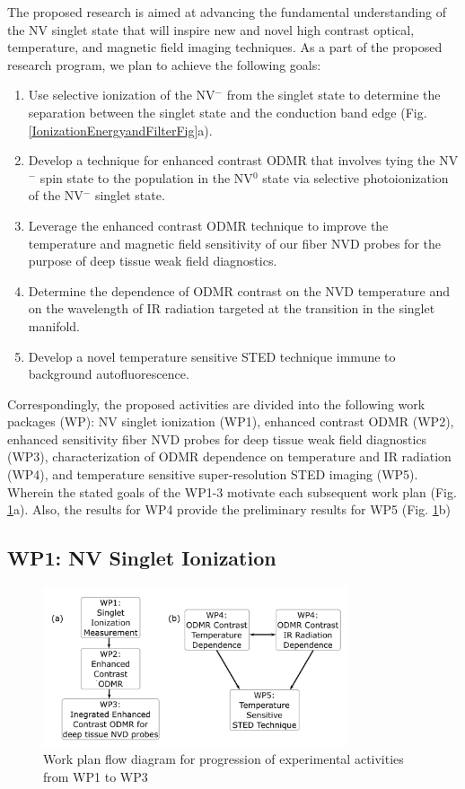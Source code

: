 \documentclass[11pt]{article}
\begin{document}
The proposed research is aimed at advancing the fundamental understanding of the NV singlet state that will
inspire new and novel high contrast optical, temperature, and magnetic field imaging techniques.  As a part of
the proposed research program, we plan to achieve the following goals:
\begin{enumerate}
\item Use selective ionization of the NV$^-$ from the singlet state to determine the separation between the singlet state and the conduction band edge (Fig. \ref{IonizationEnergyandFilterFig}a).
\item Develop a technique for enhanced contrast ODMR that involves tying the NV$^-$ spin state to the population in the NV$^0$ state via selective photoionization of the NV$^-$ singlet state.
\item Leverage the enhanced contrast ODMR technique to improve the temperature and magnetic field sensitivity of our fiber NVD probes for the purpose of deep tissue weak field diagnostics.
\item Determine the dependence of ODMR contrast on the NVD temperature and on the wavelength of IR radiation targeted at the transition in the singlet manifold.
\item Develop a novel temperature sensitive STED technique immune to background autofluorescence.
\end{enumerate}

Correspondingly, the proposed activities are divided into the following work packages (WP): NV singlet 
ionization (WP1), enhanced contrast ODMR (WP2), enhanced sensitivity fiber NVD probes for deep tissue weak field 
diagnostics (WP3), characterization of ODMR dependence on temperature and IR radiation (WP4), and temperature 
sensitive super-resolution STED imaging (WP5). Wherein the stated goals of the WP1-3 motivate each 
subsequent work plan (Fig. \ref{WP12345FlowChart}a). Also, the results for WP4 provide the preliminary results 
for WP5 (Fig. \ref{WP12345FlowChart}b)

\subsection{WP1: NV Singlet Ionization}
\begin{figure}
\centering
\includegraphics[width=0.8\textwidth]{Figures/WP12345FlowChart.png}
\caption{Work plan flow diagram for progression of experimental activities from WP1 to WP3}
\label{WP12345FlowChart}
\end{figure}
\end{document}
